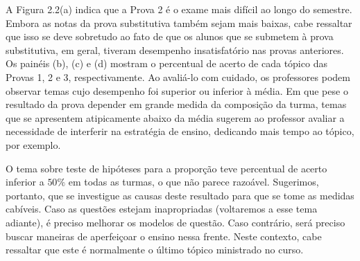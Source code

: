 \documentclass[a4paper]{report}
\begin{document}
A Figura 2.2(a) indica que a Prova 2 é o exame mais difícil ao longo do
semestre. Embora as notas da prova substitutiva também sejam mais
baixas, cabe ressaltar que isso se deve sobretudo ao fato de que os
alunos que se submetem à prova substitutiva, em geral, tiveram
desempenho insatisfatório nas provas anteriores. Os painéis (b), (c) e
(d) mostram o percentual de acerto de cada tópico das Provas 1, 2 e 3,
respectivamente. Ao avaliá-lo com cuidado, os professores podem observar
temas cujo desempenho foi superior ou inferior à média. Em que pese o
resultado da prova depender em grande medida da composição da turma,
temas que se apresentem atipicamente abaixo da média sugerem ao
professor avaliar a necessidade de interferir na estratégia de ensino,
dedicando mais tempo ao tópico, por exemplo.

O tema sobre teste de hipóteses para a proporção teve percentual de
acerto inferior a \(50\%\) em todas as turmas, o que não parece
razoável. Sugerimos, portanto, que se investigue as causas deste
resultado para que se tome as medidas cabíveis. Caso as questões estejam
inapropriadas (voltaremos a esse tema adiante), é preciso melhorar os
modelos de questão. Caso contrário, será preciso buscar maneiras de
aperfeiçoar o ensino nessa frente. Neste contexto, cabe ressaltar que
este é normalmente o último tópico ministrado no curso.
\end{document}
